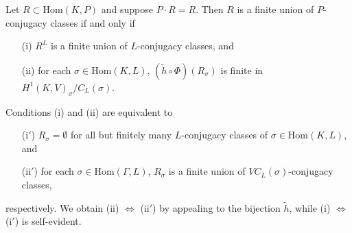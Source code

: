 \begin{theorem}\label{r:finite_p} Let $R \subset \mathrm{Hom}(K, P)$ and suppose $P \cdot R = R$. Then $R$ is a finite union of $P$-conjugacy classes if and only if
	\begin{itemize}
		\item[(i)] $R^L$ is a finite union of $L$-conjugacy classes, and
		\item[(ii)] for each $\sigma \in \mathrm{Hom}(K, L)$, $(\widetilde{h} \circ \Phi)(R_\sigma)$ is finite in $H^1(K, V)_\sigma/C_L(\sigma)$.
	\end{itemize}
\end{theorem}
\begin{remark} Conditions (i) and (ii) are equivalent to 
	\begin{itemize}
		\item[(i$'$)] $R_\sigma = \emptyset$ for all but finitely many $L$-conjugacy classes of $\sigma \in \mathrm{Hom}(K, L)$, and
		\item[(ii$'$)] for each $\sigma \in \mathrm{Hom}(\Gamma, L)$, $R_\sigma$ is a finite union of $VC_L(\sigma)$-conjugacy classes,
	\end{itemize}
	respectively. We obtain (ii) $\Leftrightarrow$ (ii$'$) by appealing to the bijection $\widetilde{h}$, while (i) $\Leftrightarrow$ (i$'$) is self-evident.
\end{remark}
